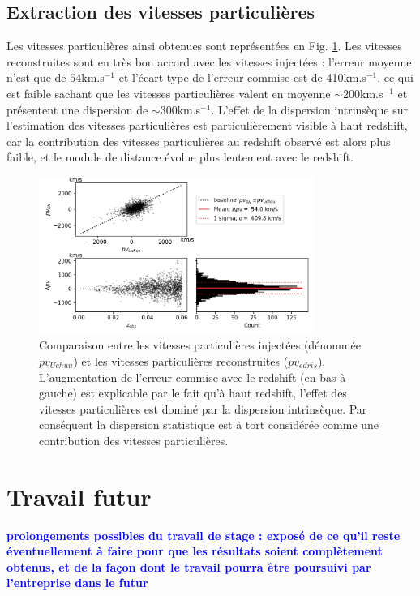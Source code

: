 \documentclass{book}
\newcommand{\consignes}[1]{{\textcolor{blue}{\bf \large #1}}}
\begin{document}
\section{Extraction des vitesses particulières}

Les vitesses particulières ainsi obtenues sont représentées en Fig. \ref{fig:vp}. Les vitesses reconstruites sont en très bon accord avec les vitesses injectées : l'erreur moyenne n'est que de $54$km.s$^{-1}$ et l'écart type de l'erreur commise est de 410km.s$^{-1}$, ce qui est faible sachant que les vitesses particulières valent en moyenne $\sim 200$km.s$^{-1}$ et présentent une dispersion de $\sim 300$km.s$^{-1}$.   L'effet de la dispersion intrinsèque sur l'estimation des vitesses particulières est particulièrement visible à haut redshift, car la contribution des vitesses particulières au redshift observé est alors plus faible, et le module de distance évolue plus lentement avec le redshift.

\begin{figure}
    \centering
    \includegraphics[width=0.8\textwidth]{figures/edris_vp_uchuu_vs_edris.png}
    \caption{Comparaison entre les vitesses particulières injectées (dénommée $pv_{Uchuu}$) et les vitesses particulières reconstruites ($pv_{edris}$). L'augmentation de l'erreur commise avec le redshift (en bas à gauche) est explicable par le fait qu'à haut redshift, l'effet des vitesses particulières est dominé par la dispersion intrinsèque. Par conséquent la dispersion statistique est à tort considérée comme une contribution des vitesses particulières.}
    \label{fig:vp}
\end{figure}


\chapter{Travail futur}
\consignes{prolongements possibles du travail de stage : exposé de ce qu’il reste éventuellement à faire pour que les résultats soient complètement obtenus, et de la façon dont le travail pourra être poursuivi par l’entreprise dans le futur}
\end{document}

